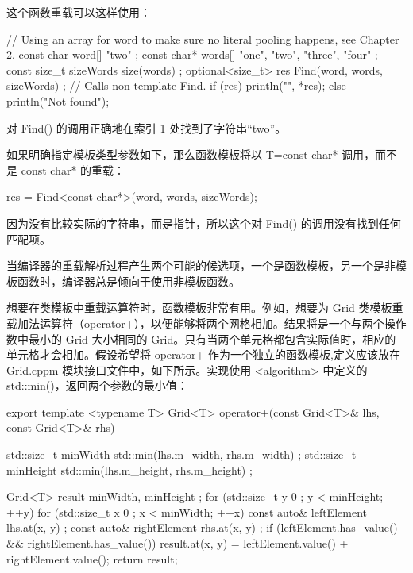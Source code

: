 这个函数重载可以这样使用：

\begin{cpp}
// Using an array for word to make sure no literal pooling happens, see Chapter 2.
const char word[] { "two" };
const char* words[] { "one", "two", "three", "four" };
const size_t sizeWords { size(words) };
optional<size_t> res { Find(word, words, sizeWords) }; // Calls non-template Find.
if (res) { println("{}", *res); }
else { println("Not found"); }
\end{cpp}

对 Find() 的调用正确地在索引 1 处找到了字符串“two”。

如果明确指定模板类型参数如下，那么函数模板将以 T=const char* 调用，而不是 const char* 的重载：

\begin{cpp}
res = Find<const char*>(word, words, sizeWords);
\end{cpp}

因为没有比较实际的字符串，而是指针，所以这个对 Find() 的调用没有找到任何匹配项。

当编译器的重载解析过程产生两个可能的候选项，一个是函数模板，另一个是非模板函数时，编译器总是倾向于使用非模板函数。


想要在类模板中重载运算符时，函数模板非常有用。例如，想要为 Grid 类模板重载加法运算符（operator+），以便能够将两个网格相加。结果将是一个与两个操作数中最小的 Grid 大小相同的 Grid。只有当两个单元格都包含实际值时，相应的单元格才会相加。假设希望将 operator+ 作为一个独立的函数模板,定义应该放在 Grid.cppm 模块接口文件中，如下所示。实现使用 <algorithm> 中定义的 std::min()，返回两个参数的最小值：

\begin{cpp}
export template <typename T>
Grid<T> operator+(const Grid<T>& lhs, const Grid<T>& rhs)
{
    std::size_t minWidth { std::min(lhs.m_width, rhs.m_width) };
    std::size_t minHeight { std::min(lhs.m_height, rhs.m_height) };

    Grid<T> result { minWidth, minHeight };
    for (std::size_t y { 0 }; y < minHeight; ++y) {
        for (std::size_t x { 0 }; x < minWidth; ++x) {
            const auto& leftElement { lhs.at(x, y) };
            const auto& rightElement { rhs.at(x, y) };
            if (leftElement.has_value() && rightElement.has_value()) {
                result.at(x, y) = leftElement.value() + rightElement.value();
            }
        }
    }
    return result;
}
\end{cpp}

